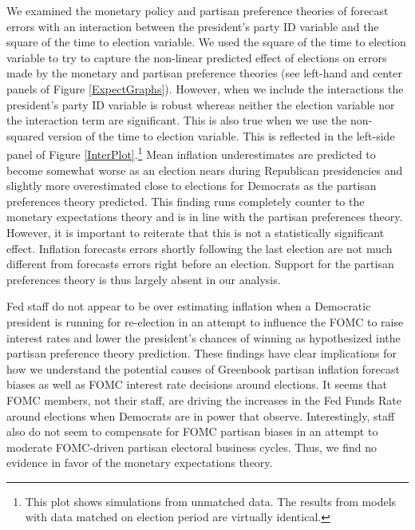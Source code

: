 \documentclass[a4paper]{article}\usepackage{graphicx, color}
\begin{document}
We examined the monetary policy and partisan preference theories of forecast errors with an interaction between the president's party ID variable and the square of the time to election variable. We used the square of the time to election variable to try to capture the non-linear predicted effect of elections on errors made by the monetary and partisan preference theories (see left-hand and center panels of Figure \ref{ExpectGraphs}). However, when we include the interactions the president's party ID variable is robust whereas neither the election variable nor the interaction term are significant. This is also true when we use the non-squared version of the time to election variable. This is reflected in the left-side panel of Figure \ref{InterPlot}.\footnote{This plot shows simulations from unmatched data. The results from models with data matched on election period are virtually identical.} Mean inflation underestimates are predicted to become somewhat worse as an election nears during Republican presidencies and slightly more overestimated close to elections for Democrats as the partisan preferences theory predicted. This finding runs completely counter to the monetary expectations theory and is in line with the partisan preferences theory. However, it is important to reiterate that this is not a statistically significant effect. Inflation forecasts errors shortly following the last election are not much different from forecasts errors right before an election. Support for the partisan preferences theory is thus largely absent in our analysis.

Fed staff do not appear to be over estimating inflation when a Democratic president is running for re-election in an attempt to influence the FOMC to raise interest rates and lower the president's chances of winning as hypothesized inthe partisan preference theory prediction. These findings have clear implications for how we understand the potential causes of Greenbook partisan inflation forecast biases as well as FOMC interest rate decisions around elections. It seems that FOMC members, not their staff, are driving the increases in the Fed Funds Rate around elections when Democrats are in power that \cite{Clark2012} observe. Interestingly, staff also do not seem to compensate for FOMC partisan biases in an attempt to moderate FOMC-driven partisan electoral business cycles. Thus, we find no evidence in favor of the monetary expectations theory.
\end{document}
